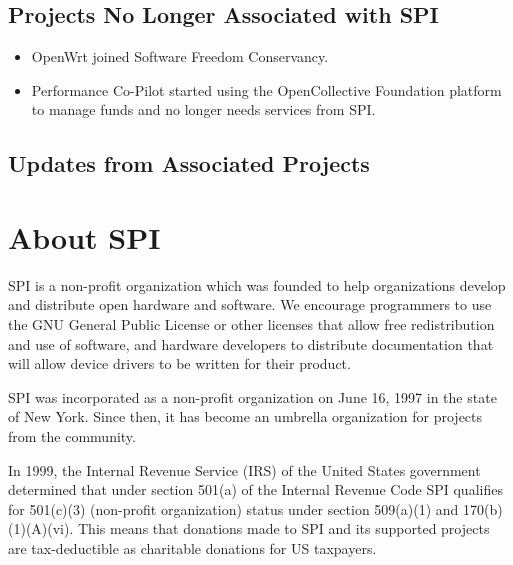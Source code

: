 \documentclass[a4paper]{report}
\begin{document}
\section{Projects No Longer Associated with SPI}

\begin{itemize}

\item OpenWrt joined Software Freedom Conservancy.

\item Performance Co-Pilot started using the OpenCollective Foundation platform to manage funds and no longer needs services from SPI.

\end{itemize}

\section{Updates from Associated Projects}


\appendix
\chapter{About SPI}

SPI is a non-profit organization which was founded to help organizations develop and distribute open hardware and software. We encourage programmers to use the GNU General Public License or other licenses that allow free redistribution and use of software, and hardware developers to distribute documentation that will allow device drivers to be written for their product.

SPI was incorporated as a non-profit organization on June 16, 1997 in the state of New York. Since then, it has become an umbrella organization for projects from the community.

In 1999, the Internal Revenue Service (IRS) of the United States government determined that under section 501(a) of the Internal Revenue Code SPI qualifies for 501(c)(3) (non-profit organization) status under section 509(a)(1) and 170(b)(1)(A)(vi). This means that donations made to SPI and its supported projects are tax-deductible as charitable donations for US taxpayers.

\newpage

\pagestyle{empty}
\end{document}
